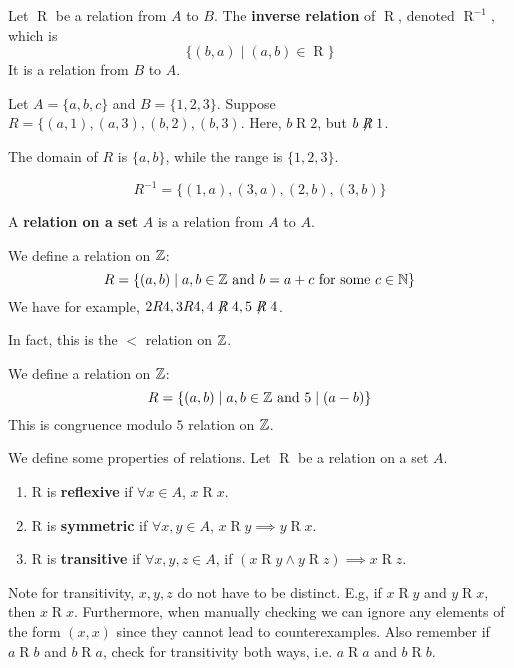 \documentclass{article}
\begin{document}
\begin{definition}
  Let $\mathrel{R}$ be a relation from $A$ to $B$. The \textbf{inverse relation} of $\mathrel{R}$, denoted $\mathrel{R}^{-1}$, which is
  \[
    \{(b, a) \mid (a, b) \in \mathrel{R}\}
  \]
  It is a relation from $B$ to $A$.
\end{definition}
\begin{example}
  Let $A = \{a, b, c\}$ and $B = \{1, 2, 3\}$. Suppose $R = \{(a, 1), (a, 3), (b,2), (b, 3)$. Here, $b \mathrel{R} 2$, but $b \not \mathrel{R} 1$.

    The domain of $R$ is $\{a, b\}$, while the range is $\{1, 2, 3\}$.

    \[R^{-1} = \{(1, a), (3, a), (2, b), (3, b)\}\]
  \end{example}
  \begin{definition}
    A \textbf{relation on a set} $A$ is a relation from $A$ to $A$.
  \end{definition}
  \begin{examples}
    We define a relation on $\mathbb{Z}$:
    \[
      R = \{(a, b) \mid a, b \in \mathbb{Z} \text{ and } b = a+c \text{ for some } c \in \mathbb{N}\}
    \]
    We have for example, $2R4, 3R4, 4\not \mathrel{R}4, 5\not \mathrel{R}4$.

    In fact, this is the $<$ relation on $\mathbb{Z}$.

    We define a relation on $\mathbb{Z}$:
    \[
      R = \{(a, b) \mid a, b \in \mathbb{Z} \text{ and } 5 \mid (a-b)\}
    \]
    This is congruence modulo $5$ relation on $\mathbb{Z}$.
  \end{examples}
  \begin{definition}
    We define some properties of relations. Let $\mathrel{R}$ be a relation on a set $A$.

    \begin{enumerate}
      \item R is \textbf{reflexive} if $\forall x \in A$, $x \mathrel{R} x$.
      \item R is \textbf{symmetric} if $\forall x, y \in A$, $x \mathrel{R} y \implies y \mathrel{R} x$.
      \item R is \textbf{transitive} if $\forall x, y, z \in A$, if $(x \mathrel{R} y \wedge y \mathrel{R} z) \implies x \mathrel{R} z$.
    \end{enumerate}
  \end{definition}
  \begin{remark}
    Note for transitivity, $x, y, z$ do not have to be distinct. E.g, if $x \mathrel{R} y$ and $y \mathrel{R} x$, then $x \mathrel{R} x$. Furthermore, when manually checking we can ignore any elements of the form $(x, x)$ since they cannot lead to counterexamples. Also remember if $a \mathrel{R} b$ and $b \mathrel{R} a$, check for transitivity both ways, i.e. $a \mathrel{R} a$ and $b \mathrel{R} b$.
  \end{remark}
\end{document}
